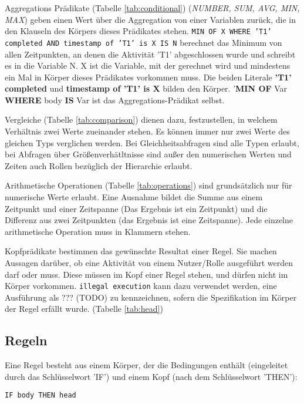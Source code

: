 Aggregations Prädikate (Tabelle \ref{tab:conditional}) (\textit{NUMBER, SUM, AVG, MIN, MAX}) geben einen Wert über die Aggregation von einer Variablen zurück, die in den Klauseln des Körpers dieses Prädikates stehen. \texttt{MIN OF X WHERE 'T1' completed AND timestamp of 'T1' is X IS N} berechnet das Minimum von allen Zeitpunkten, an denen die Aktivität 'T1' abgeschlossen wurde und schreibt es in die Variable N. X ist die Variable, mit der gerechnet wird und mindestens ein Mal in Körper dieses Prädikates vorkommen muss. Die beiden Literale \textbf{'T1' completed} und \textbf{timestamp of 'T1' is X} bilden den Körper. '\textbf{MIN OF} Var \textbf{WHERE} body \textbf{IS} Var ist das Aggregations-Prädikat selbst.



Vergleiche (Tabelle \ref{tab:comparison}) dienen dazu, festzustellen, in welchem Verhältnis zwei Werte zueinander stehen. Es können immer nur zwei Werte des gleichen Typs verglichen werden. Bei Gleichheitsabfragen sind alle Typen erlaubt, bei Abfragen über Größenverhätltnisse sind außer den numerischen Werten und Zeiten auch Rollen bezüglich der Hierarchie erlaubt.


Arithmetische Operationen (Tabelle \ref{tab:operations}) sind grundsätzlich nur für numerische Werte erlaubt. Eine Ausnahme bildet die Summe aus einem Zeitpunkt und einer Zeitspanne (Das Ergebnis ist ein Zeitpunkt) und die Differenz aus zwei Zeitpunkten (das Ergebnis ist eine Zeitspanne). Jede einzelne arithmetische Operation muss in Klammern stehen.

Kopfprädikate bestimmen das gewünschte Resultat einer Regel. Sie machen Aussagen darüber, ob eine Aktivität von einem Nutzer/Rolle ausgeführt werden darf oder muss. Diese müssen im Kopf einer Regel stehen, und dürfen nicht im Körper vorkommen. \texttt{illegal execution} kann dazu verwendet werden, eine Ausführung als ??? (TODO) zu kennzeichnen, sofern die Spezifikation im Körper der Regel erfällt wurde. (Tabelle \ref{tab:head})




\subsection{Regeln}

Eine Regel besteht aus einem Körper, der die Bedingungen enthält (eingeleitet durch das Schlüsselwort 'IF') und einem Kopf (nach dem Schlüsselwort 'THEN'):
\begin{verbatim}
IF body THEN head
\end{verbatim}

